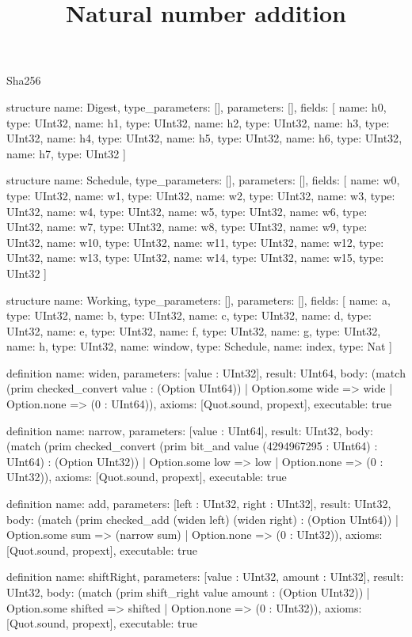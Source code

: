 \begin{lexlean}{Sha256}
\title{Natural number addition}
\begin{semanticmodule}
structure{
  name: Digest,
  type_parameters: [],
  parameters: [],
  fields: [
    {name: h0, type: UInt32},
    {name: h1, type: UInt32},
    {name: h2, type: UInt32},
    {name: h3, type: UInt32},
    {name: h4, type: UInt32},
    {name: h5, type: UInt32},
    {name: h6, type: UInt32},
    {name: h7, type: UInt32}
  ]
}

structure{
  name: Schedule,
  type_parameters: [],
  parameters: [],
  fields: [
    {name: w0, type: UInt32},
    {name: w1, type: UInt32},
    {name: w2, type: UInt32},
    {name: w3, type: UInt32},
    {name: w4, type: UInt32},
    {name: w5, type: UInt32},
    {name: w6, type: UInt32},
    {name: w7, type: UInt32},
    {name: w8, type: UInt32},
    {name: w9, type: UInt32},
    {name: w10, type: UInt32},
    {name: w11, type: UInt32},
    {name: w12, type: UInt32},
    {name: w13, type: UInt32},
    {name: w14, type: UInt32},
    {name: w15, type: UInt32}
  ]
}

structure{
  name: Working,
  type_parameters: [],
  parameters: [],
  fields: [
    {name: a, type: UInt32},
    {name: b, type: UInt32},
    {name: c, type: UInt32},
    {name: d, type: UInt32},
    {name: e, type: UInt32},
    {name: f, type: UInt32},
    {name: g, type: UInt32},
    {name: h, type: UInt32},
    {name: window, type: Schedule},
    {name: index, type: Nat}
  ]
}

definition{
  name: widen,
  parameters: [value : UInt32],
  result: UInt64,
  body: (match (prim checked_convert value : (Option UInt64))
    | Option.some wide => wide
    | Option.none => (0 : UInt64)),
  axioms: [Quot.sound, propext],
  executable: true
}

definition{
  name: narrow,
  parameters: [value : UInt64],
  result: UInt32,
  body: (match (prim checked_convert (prim bit_and value (4294967295 : UInt64) : UInt64) : (Option UInt32))
    | Option.some low => low
    | Option.none => (0 : UInt32)),
  axioms: [Quot.sound, propext],
  executable: true
}

definition{
  name: add,
  parameters: [left : UInt32, right : UInt32],
  result: UInt32,
  body: (match (prim checked_add (widen left) (widen right) : (Option UInt64))
    | Option.some sum => (narrow sum)
    | Option.none => (0 : UInt32)),
  axioms: [Quot.sound, propext],
  executable: true
}

definition{
  name: shiftRight,
  parameters: [value : UInt32, amount : UInt32],
  result: UInt32,
  body: (match (prim shift_right value amount : (Option UInt32))
    | Option.some shifted => shifted
    | Option.none => (0 : UInt32)),
  axioms: [Quot.sound, propext],
  executable: true
}


\end{semanticmodule}
\end{lexlean}
